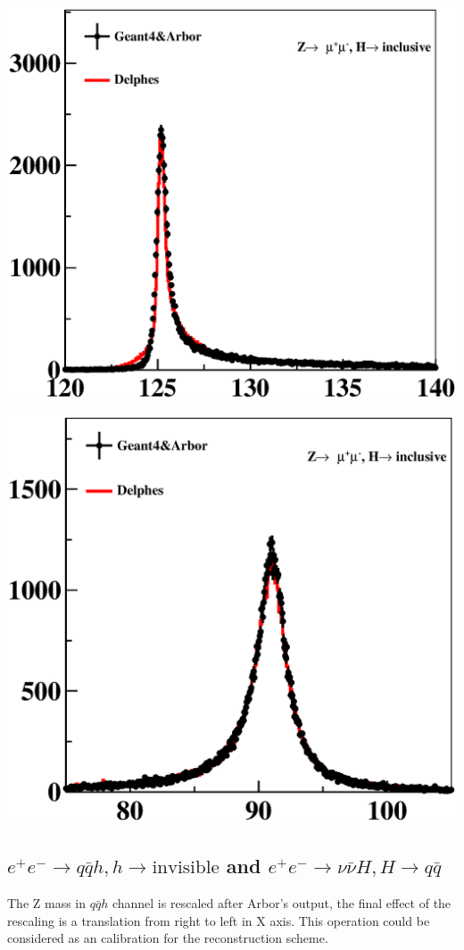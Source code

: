 \documentclass[a4paper,10pt,twoside]{cpc-hepnp}
\begin{document}
\begin{center}
\includegraphics[width=0.9\linewidth]{e2e2h_reco}
\end{center}
\begin{center}
\includegraphics[width=0.9\linewidth]{e2e2h_mass}
\end{center}

\subsection{$e^+e^-\to q\bar{q}h, h \to\mbox{invisible}$ and $e^+e^-\to \nu\bar{\nu}H, H\to q\bar{q}$}
The Z mass in $q\bar{q}h$ channel is rescaled after Arbor's output, the final effect of the rescaling is a translation from right to left in X axis. This operation could be considered as an calibration for the reconstruction scheme. 
\end{document}
